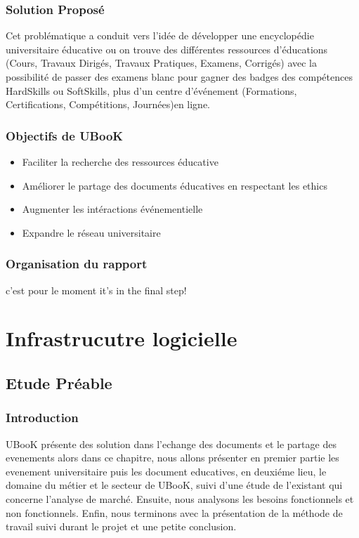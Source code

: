 \documentclass[12pt]{report}
\begin{document}
\section*{Solution Proposé}
Cet problématique a conduit vers l'idée de développer une encyclopédie universitaire éducative ou on trouve des différentes ressources d'éducations (Cours, Travaux Dirigés, Travaux Pratiques, Examens, Corrigés) avec la possibilité de passer des examens blanc pour gagner des badges des compétences HardSkills ou SoftSkills, plus d'un centre d'événement (Formations, Certifications, Compétitions, Journées)en ligne.
\section*{Objectifs de UBooK}
\begin{itemize}
\item Faciliter la recherche des ressources éducative
\item Améliorer le partage des documents éducatives en respectant les ethics
\item Augmenter les intéractions événementielle 
\item Expandre le réseau universitaire 
\end{itemize}
\section*{Organisation du rapport}
c'est pour le moment it's in the final step!
\part{Infrastrucutre logicielle}
\chapter{Etude Préable}


\section*{Introduction}

UBooK présente des solution dans l'echange des documents et le partage des evenements alors dans ce chapitre, nous allons présenter en premier partie les evenement universitaire puis les document educatives, en deuxiéme lieu, le domaine du métier et le secteur de UBooK, suivi d’une
étude de l'existant qui concerne l'analyse de marché. Ensuite, nous analysons les besoins fonctionnels et non fonctionnels. Enfin, nous terminons avec la présentation de la méthode de travail suivi durant le projet et une petite conclusion.
\end{document}
